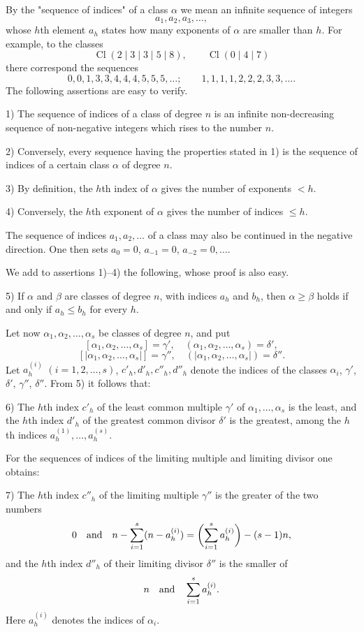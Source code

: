 \documentclass[11pt,a4paper]{article}
\newcommand{\Cl}{\operatorname{Cl}}
\begin{document}
By the "sequence of indices" of a class $\alpha$ we mean an infinite sequence of integers
\[
 a_1,a_2,a_3,\ldots,
\]
whose $h$th element $a_h$ states how many exponents of $\alpha$ are smaller than $h$. For example, to the classes
\[
 \Cl(2\mid3\mid3\mid5\mid8),\qquad \Cl(0\mid4\mid7)
\]
there correspond the sequences
\[
 0,0,1,3,3,4,4,4,5,5,5,\ldots;
 \qquad
 1,1,1,1,2,2,2,3,3,\ldots.
\]
The following assertions are easy to verify.

1) The sequence of indices of a class of degree $n$ is an infinite non-decreasing sequence of non-negative integers which rises to the number $n$.

2) Conversely, every sequence having the properties stated in 1) is the sequence of indices of a certain class $\alpha$ of degree $n$.

3) By definition, the $h$th index of $\alpha$ gives the number of exponents $<h$.

4) Conversely, the $h$th exponent of $\alpha$ gives the number of indices $\le h$.

The sequence of indices $a_1,a_2,\ldots$ of a class may also be continued in the negative direction. One then sets $a_0=0$, $a_{-1}=0$, $a_{-2}=0,
\ldots$.

We add to assertions 1)--4) the following, whose proof is also easy.

5) If $\alpha$ and $\beta$ are classes of degree $n$, with indices $a_h$ and $b_h$, then $\alpha\ge\beta$ holds if and only if $a_h\le b_h$ for every $h$.

Let now $\alpha_1,
\alpha_2,
\ldots,
\alpha_s$ be classes of degree $n$, and put
\[
 [\alpha_1,\alpha_2,\ldots,\alpha_s]=\gamma',\quad
 (\alpha_1,\alpha_2,\ldots,\alpha_s)=\delta',
\]
\[
 [|\alpha_1,\alpha_2,\ldots,\alpha_s|]=\gamma'',\quad
 (|\alpha_1,\alpha_2,\ldots,\alpha_s|)=\delta''.
\]
Let $a_h^{(i)}$ $(i=1,2,\ldots,s)$, $c'_h,d'_h,c''_h,d''_h$ denote the indices of the classes $\alpha_i$, $\gamma'$, $\delta'$, $\gamma''$, $\delta''$. From 5) it follows that:

6) The $h$th index $c'_h$ of the least common multiple $\gamma'$ of $\alpha_1,
\ldots,\alpha_s$ is the least, and the $h$th index $d'_h$ of the greatest common divisor $\delta'$ is the greatest, among the $h$th indices $a_h^{(1)},\ldots,a_h^{(s)}$.

For the sequences of indices of the limiting multiple and limiting divisor one obtains:

7) The $h$th index $c''_h$ of the limiting multiple $\gamma''$ is the greater of the two numbers
\[
 0\quad\hbox{and}\quad n-\sum_{i=1}^s(n-a_h^{(i)})=\biggl(\sum_{i=1}^s a_h^{(i)}\biggr)-(s-1)n,
\]
and the $h$th index $d''_h$ of their limiting divisor $\delta''$ is the smaller of
\[
 n\quad\hbox{and}\quad \sum_{i=1}^s a_h^{(i)}.
\]
Here $a_h^{(i)}$ denotes the indices of $\alpha_i$.
\end{document}
